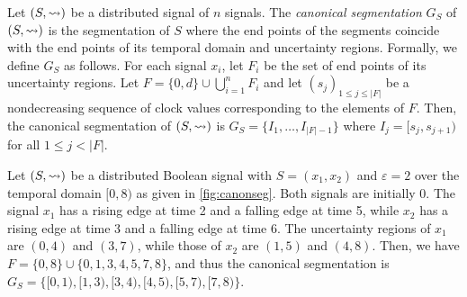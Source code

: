 
Let $(S,{\rightsquigarrow})$ be a distributed signal of $n$ signals.
The \emph{canonical segmentation} $G_S$ of $(S,{\rightsquigarrow})$ is the segmentation of $S$ where the end points of the segments coincide with the end points of its temporal domain and uncertainty regions.
Formally, we define $G_S$ as follows.
For each signal $x_i$,  let $F_i$ be the set of end points of its 
uncertainty regions.
%
Let $F = \{0, d\} \cup \bigcup_{i = 1}^{n} F_i$ and let $(s_j)_{1 
\leq j \leq |F|}$ be a nondecreasing sequence of clock values corresponding to the elements of $F$.
Then, the canonical segmentation of $(S,{\rightsquigarrow})$ is $G_S = \{I_1, \ldots, I_{|F| - 1}\}$ where $I_j = [s_j, s_{j+1})$ for all $1 \leq j < |F|$.

\begin{example} \label{ex:canonseg}
	Let $(S, {\rightsquigarrow})$ be a distributed Boolean signal with $S = (x_1, x_2)$ and $\varepsilon = 2$ over 
	the temporal domain $[0,8)$ as given in \cref{fig:canonseg}.
	Both signals are initially 0.
	The signal $x_1$ has a rising edge at time 2 and a falling edge at time 5, while $x_2$ has a rising edge at time 3 and a falling edge at time 6.
	The uncertainty regions of $x_1$ are $(0,4)$ and $(3,7)$, while those of $x_2$ are $(1,5)$ and $(4,8)$.
	Then, we have $F = \{0, 8\} \cup \{0, 1, 3, 4, 5, 7, 8\}$, and thus the canonical segmentation is $G_S = \{ [0,1), [1,3), [3,4), [4,5), [5,7), [7,8) \}$.
\end{example}

